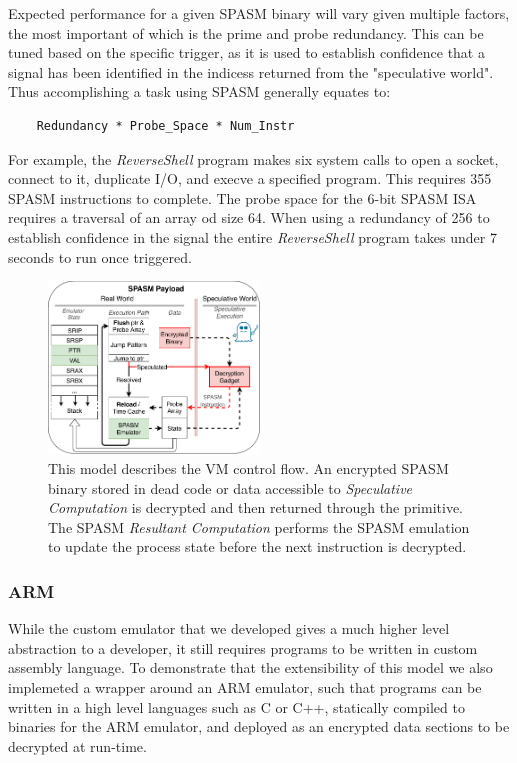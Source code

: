 Expected performance for a given SPASM binary will vary given multiple factors, 
the most important of which is the prime and probe redundancy. This can be tuned
based on the specific trigger, as it is used to establish confidence that a signal 
has been identified in the indicess returned from the "speculative world". 
Thus accomplishing a task using SPASM generally equates to:

\begin{lstlisting}
    Redundancy * Probe_Space * Num_Instr
\end{lstlisting}

For example, the \textit{ReverseShell} program makes six system calls to open a socket,
connect to it, duplicate I/O, and execve a specified program. This requires 355
SPASM instructions to complete. The probe space for the 6-bit SPASM ISA requires 
a traversal of an array od size 64. When using a redundancy of 256 to establish
confidence in the signal the entire \textit{ReverseShell} program takes under 7 
seconds to run once triggered. 

\begin{figure}[b]
    \centering
        \includegraphics[width=0.5\textwidth]{figures/spasm_model}
    \caption{This model describes the VM control flow. An encrypted SPASM binary 
        stored in dead code or data accessible to \textit{Speculative Computation} 
        is decrypted  and then returned through the primitive. The SPASM 
        \textit{Resultant Computation} performs the SPASM emulation to update the 
        process state before the next instruction is decrypted.}
    \label{fig:spasm_model}
\end{figure}

\subsubsection{ARM}
\label{subsubsec:arm}
While the custom emulator that we developed gives a much higher level abstraction to 
a developer, it still requires programs to be written in custom assembly 
language. To demonstrate that the extensibility of this model we also implemeted a wrapper
around an ARM emulator, such that programs can be written in a high level languages 
such as C or C++, statically compiled to binaries for the ARM emulator, and deployed 
as an encrypted data sections to be decrypted at run-time.  


